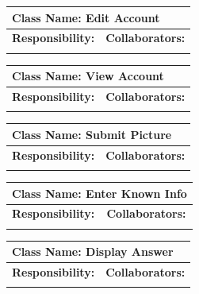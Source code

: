 \documentclass[]{article}
\begin{document}
\begin{itemize}
	\begin{table}
		\centering
		\begin{tabular}{|p{5cm}|p{5cm}|}
		\hline 
		 \multicolumn{2}{|l|}{\textbf{Class Name:} Edit Account} \\
		\hline
		\textbf{Responsibility:} & \textbf{Collaborators:} \\
		\hline
		\vspace{1in} & \\
		\hline
		\end{tabular}
	\end{table}

	\begin{table}
		\centering
		\begin{tabular}{|p{5cm}|p{5cm}|}
		\hline 
		 \multicolumn{2}{|l|}{\textbf{Class Name:} View Account} \\
		\hline
		\textbf{Responsibility:} & \textbf{Collaborators:} \\
		\hline
		\vspace{1in} & \\
		\hline
		\end{tabular}
	\end{table}

	\begin{table}
		\centering
		\begin{tabular}{|p{5cm}|p{5cm}|}
		\hline 
		 \multicolumn{2}{|l|}{\textbf{Class Name:} Submit Picture} \\
		\hline
		\textbf{Responsibility:} & \textbf{Collaborators:} \\
		\hline
		\vspace{1in} & \\
		\hline
		\end{tabular}
	\end{table}

	\begin{table}
		\centering
		\begin{tabular}{|p{5cm}|p{5cm}|}
		\hline 
		 \multicolumn{2}{|l|}{\textbf{Class Name:} Enter Known Info} \\
		\hline
		\textbf{Responsibility:} & \textbf{Collaborators:} \\
		\hline
		\vspace{1in} & \\
		\hline
		\end{tabular}
	\end{table}

	\begin{table}
		\centering
		\begin{tabular}{|p{5cm}|p{5cm}|}
		\hline 
		 \multicolumn{2}{|l|}{\textbf{Class Name:} Display Answer} \\
		\hline
		\textbf{Responsibility:} & \textbf{Collaborators:} \\
		\hline
		\vspace{1in} & \\
		\hline
		\end{tabular}
	\end{table}


\end{itemize}
\end{document}

